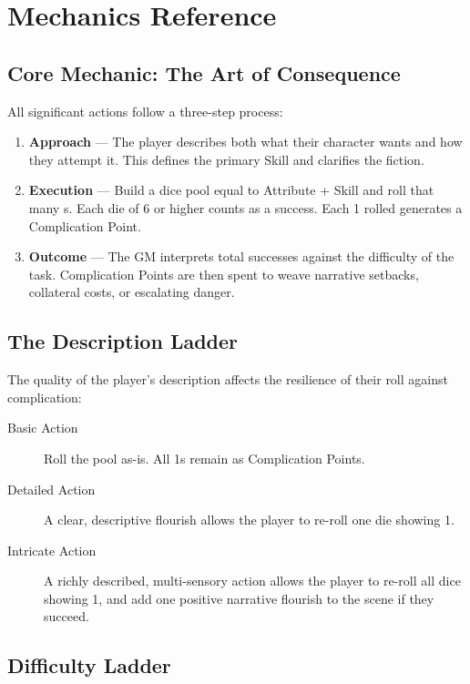 \chapter{Mechanics Reference}

\section{Core Mechanic: The Art of Consequence}

All significant actions follow a three-step process:

\begin{enumerate}
\item \textbf{Approach} --- The player describes both what their character wants and how they attempt it. This defines the primary Skill and clarifies the fiction.
\item \textbf{Execution} --- Build a dice pool equal to Attribute + Skill and roll that many s. Each die of 6 or higher counts as a success. Each 1 rolled generates a Complication Point.
\item \textbf{Outcome} --- The GM interprets total successes against the difficulty of the task. Complication Points are then spent to weave narrative setbacks, collateral costs, or escalating danger.
\end{enumerate}

\section{The Description Ladder}

The quality of the player's description affects the resilience of their roll against complication:

\begin{description}
\item[Basic Action] Roll the pool as-is. All 1s remain as Complication Points.
\item[Detailed Action] A clear, descriptive flourish allows the player to re-roll one die showing 1.
\item[Intricate Action] A richly described, multi-sensory action allows the player to re-roll all dice showing 1, and add one positive narrative flourish to the scene if they succeed.
\end{description}

\section{Difficulty Ladder}

